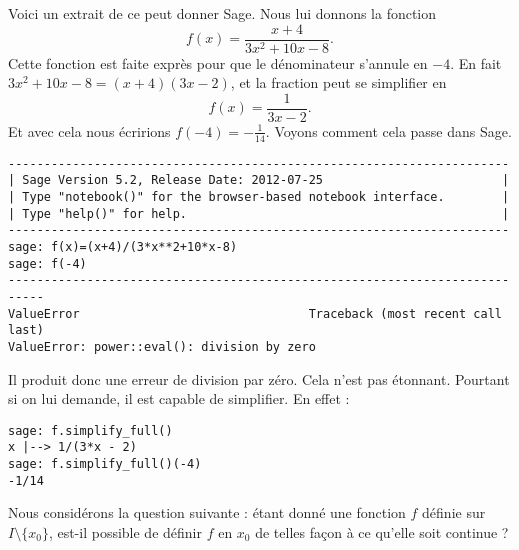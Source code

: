 Voici un extrait de ce peut donner Sage. Nous lui donnons la fonction
\begin{equation}    \label{EqyEHTBZ}
    f(x)=\frac{ x+4 }{ 3x^2+10x-8 }.
\end{equation}
Cette fonction est faite exprès pour que le dénominateur s'annule en \( -4\). En fait \( 3x^2+10x-8=(x+4)(3x-2)\), et la fraction peut se simplifier en
\begin{equation}
    f(x)=\frac{1}{ 3x-2 }.
\end{equation}
Et avec cela nous écririons \( f(-4)=-\frac{1}{ 14 }\). Voyons comment cela passe dans Sage.

\begin{verbatim}
----------------------------------------------------------------------
| Sage Version 5.2, Release Date: 2012-07-25                         |
| Type "notebook()" for the browser-based notebook interface.        |
| Type "help()" for help.                                            |
----------------------------------------------------------------------
sage: f(x)=(x+4)/(3*x**2+10*x-8)                                                                                              
sage: f(-4)
---------------------------------------------------------------------------
ValueError                                Traceback (most recent call last)
ValueError: power::eval(): division by zero
\end{verbatim}
Il produit donc une erreur de division par zéro. Cela n'est pas étonnant. Pourtant si on lui demande, il est capable de simplifier. En effet :
\begin{verbatim}
sage: f.simplify_full()                                                                                                        
x |--> 1/(3*x - 2)                                                                                                                                           
sage: f.simplify_full()(-4)                                                                                                                                  
-1/14                                                                                                                                                        
\end{verbatim}

Nous considérons la question suivante : étant donné une fonction \( f\) définie sur \( I\setminus\{ x_0 \}\), est-il possible de définir \( f\) en \( x_0\) de telles façon à ce qu'elle soit continue ?

